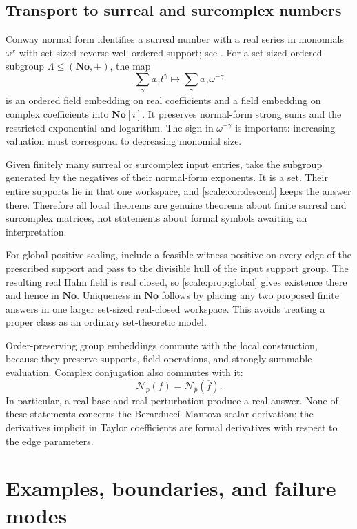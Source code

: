 \documentclass[11pt,a4paper]{article}
\numberwithin{equation}{section}
\theoremstyle{definition}
\newcommand{\No}{\mathbf{No}}
\newcommand{\NN}{\mathcal N}
\begin{document}
\subsection{Transport to surreal and surcomplex numbers}
Conway normal form identifies a surreal number with a real series
in monomials $\omega^x$ with set-sized reverse-well-ordered support;
see \cite{Gonshor,BM}. For a set-sized ordered subgroup
$\Lambda\leq(\No,+)$, the map
\begin{equation}\label{scale:eq:surrealembedding}
 \sum_{\gamma}a_\gamma t^\gamma
 \longmapsto\sum_\gamma a_\gamma\omega^{-\gamma}
\end{equation}
is an ordered field embedding on real coefficients and a field
embedding on complex coefficients into $\No[i]$. It preserves
normal-form strong sums and the restricted exponential and logarithm.
The sign in $\omega^{-\gamma}$ is important: increasing valuation
must correspond to decreasing monomial size.

Given finitely many surreal or surcomplex input entries, take the
subgroup generated by the negatives of their normal-form exponents.
It is a set. Their entire supports lie in that one workspace, and
\cref{scale:cor:descent} keeps the answer there. Therefore all local
theorems are genuine theorems about finite surreal and surcomplex
matrices, not statements about formal symbols awaiting an
interpretation.

For global positive scaling, include a feasible witness positive on every
edge of the prescribed support and pass to the divisible hull of the input support group. The resulting
real Hahn field is real closed, so \cref{scale:prop:global} gives
existence there and hence in $\No$. Uniqueness in $\No$ follows by
placing any two proposed finite answers in one larger set-sized
real-closed workspace. This avoids treating a proper class as an
ordinary set-theoretic model.

Order-preserving group embeddings commute with the local construction,
because they preserve supports, field operations, and strongly
summable evaluation. Complex conjugation also commutes with it:
\[
 \overline{\NN_p(f)}=\NN_{\overline p}(\overline f).
\]
In particular, a real base and real perturbation produce a real
answer. None of these statements concerns the Berarducci--Mantova
scalar derivation; the derivatives implicit in Taylor coefficients
are formal derivatives with respect to the edge parameters.

\section{Examples, boundaries, and failure modes}\label{scale:sec:boundaries}
\end{document}
